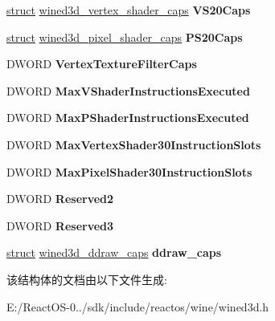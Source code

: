 \begin{DoxyCompactItemize}
\hyperlink{interfacestruct}{struct} \hyperlink{structwined3d__vertex__shader__caps}{wined3d\+\_\+vertex\+\_\+shader\+\_\+caps} {\bfseries V\+S20\+Caps}
\item 
\mbox{\label{struct___w_i_n_e_d3_d_c_a_p_s_a0f3669c5c8bd24eb6e158ebe6069051c}} 
\hyperlink{interfacestruct}{struct} \hyperlink{structwined3d__pixel__shader__caps}{wined3d\+\_\+pixel\+\_\+shader\+\_\+caps} {\bfseries P\+S20\+Caps}
\item 
\mbox{\label{struct___w_i_n_e_d3_d_c_a_p_s_addd8d15ffa3fa42f61eac4e038d5780d}} 
D\+W\+O\+RD {\bfseries Vertex\+Texture\+Filter\+Caps}
\item 
\mbox{\label{struct___w_i_n_e_d3_d_c_a_p_s_a9b5150779a4ce410d8f5443d58877c01}} 
D\+W\+O\+RD {\bfseries Max\+V\+Shader\+Instructions\+Executed}
\item 
\mbox{\label{struct___w_i_n_e_d3_d_c_a_p_s_afdae8c770c7d7a2464586d12fb607d42}} 
D\+W\+O\+RD {\bfseries Max\+P\+Shader\+Instructions\+Executed}
\item 
\mbox{\label{struct___w_i_n_e_d3_d_c_a_p_s_a000a5b6f7324ffe876dd8c7f5a0a444f}} 
D\+W\+O\+RD {\bfseries Max\+Vertex\+Shader30\+Instruction\+Slots}
\item 
\mbox{\label{struct___w_i_n_e_d3_d_c_a_p_s_afb6167a876c86fe06b503eb78e666820}} 
D\+W\+O\+RD {\bfseries Max\+Pixel\+Shader30\+Instruction\+Slots}
\item 
\mbox{\label{struct___w_i_n_e_d3_d_c_a_p_s_a795b7b029d76413328f77143f91f3a88}} 
D\+W\+O\+RD {\bfseries Reserved2}
\item 
\mbox{\label{struct___w_i_n_e_d3_d_c_a_p_s_a8c424d65e21c0f79f36f855d70761dd9}} 
D\+W\+O\+RD {\bfseries Reserved3}
\item 
\mbox{\label{struct___w_i_n_e_d3_d_c_a_p_s_a16a2f6f18d2950e63554f535733efe5c}} 
\hyperlink{interfacestruct}{struct} \hyperlink{structwined3d__ddraw__caps}{wined3d\+\_\+ddraw\+\_\+caps} {\bfseries ddraw\+\_\+caps}
\end{DoxyCompactItemize}


该结构体的文档由以下文件生成\+:\begin{DoxyCompactItemize}
\item 
E\+:/\+React\+O\+S-\/0../sdk/include/reactos/wine/wined3d.\+h\end{DoxyCompactItemize}
